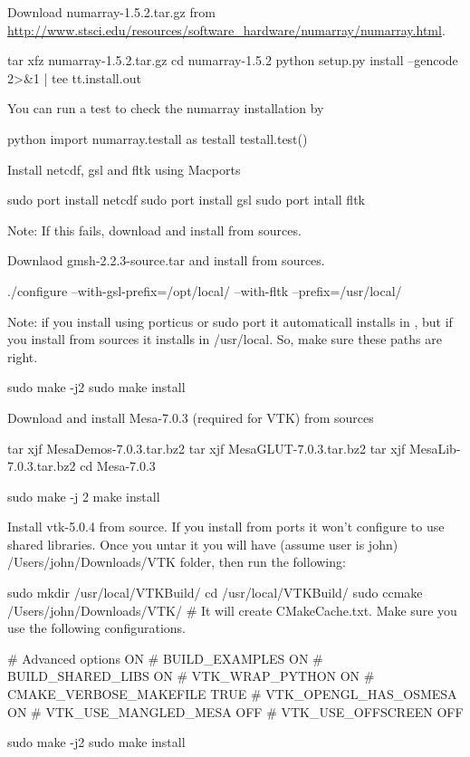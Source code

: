 Download numarray-1.5.2.tar.gz from \\
\url{http://www.stsci.edu/resources/software_hardware/numarray/numarray.html}. 
\begin{shellCode}
tar xfz numarray-1.5.2.tar.gz
cd numarray-1.5.2
python setup.py install --gencode  2>&1 | tee tt.install.out
\end{shellCode}

You can run a test to check the numarray installation by
\begin{shellCode}
python
import numarray.testall as testall
testall.test()
\end{shellCode}
 
Install netcdf, gsl and fltk using Macports 
\begin{shellCode}
sudo port install netcdf
sudo port install gsl
sudo port intall fltk
\end{shellCode}
Note: If this fails, download and install from sources. 
 
Downlaod gmsh-2.2.3-source.tar and install from sources.
\begin{shellCode}
./configure --with-gsl-prefix=/opt/local/  --with-fltk    --prefix=/usr/local/
\end{shellCode}
Note: if you install using porticus or sudo port  it automaticall installs in , but if you install from sources it installs in /usr/local. So, make sure these paths are right.
\begin{shellCode}
sudo make -j2
sudo make install
\end{shellCode} 
 
Download and install Mesa-7.0.3 (required for VTK) from sources
\begin{shellCode}
tar xjf MesaDemos-7.0.3.tar.bz2
tar xjf MesaGLUT-7.0.3.tar.bz2
tar xjf MesaLib-7.0.3.tar.bz2
cd Mesa-7.0.3
 
sudo make -j 2
make install
\end{shellCode} 
 
Install vtk-5.0.4 from source. If you install from ports it won't configure to use shared libraries.
Once you untar it you will have (assume user is john) /Users/john/Downloads/VTK folder, then run the following:
 
\begin{shellCode}
sudo mkdir /usr/local/VTKBuild/
cd /usr/local/VTKBuild/
sudo ccmake /Users/john/Downloads/VTK/ 
# It will create CMakeCache.txt. Make sure  you use the following configurations.
 
#       Advanced options			ON
#       BUILD_EXAMPLES				ON
#       BUILD_SHARED_LIBS			ON
#       VTK_WRAP_PYTHON				ON
#       CMAKE_VERBOSE_MAKEFILE			TRUE
#       VTK_OPENGL_HAS_OSMESA			ON
#       VTK_USE_MANGLED_MESA			OFF
#       VTK_USE_OFFSCREEN			OFF
 
sudo make -j2
sudo make install
\end{shellCode}
 
